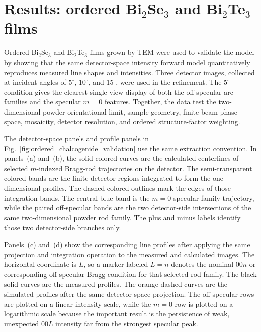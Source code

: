 \section{Results: ordered Bi\texorpdfstring{$_2$}{2}Se\texorpdfstring{$_3$}{3} and Bi\texorpdfstring{$_2$}{2}Te\texorpdfstring{$_3$}{3} films}
\label{sec:results_ordered}

Ordered Bi$_2$Se$_3$ and Bi$_2$Te$_3$ films grown by TEM were used to validate the model by showing that the same detector-space intensity forward model quantitatively reproduces measured line shapes and intensities. Three detector images, collected at incident angles of $5^\circ$, $10^\circ$, and $15^\circ$, were used in the refinement. The $5^\circ$ condition gives the clearest single-view display of both the off-specular arc families and the specular $m=0$ features. Together, the data test the two-dimensional powder orientational limit, sample geometry, finite beam phase space, mosaicity, detector resolution, and ordered structure-factor weighting.

The detector-space panels and profile panels in Fig.~\ref{fig:ordered_chalcogenide_validation} use the same extraction convention. In panels~(a) and~(b), the solid colored curves are the calculated centerlines of selected $m$-indexed Bragg-rod trajectories on the detector. The semi-transparent colored bands are the finite detector regions integrated to form the one-dimensional profiles. The dashed colored outlines mark the edges of those integration bands. The central blue band is the $m=0$ specular-family trajectory, while the paired off-specular bands are the two detector-side intersections of the same two-dimensional powder rod family. The plus and minus labels identify those two detector-side branches only.

Panels~(c) and~(d) show the corresponding line profiles after applying the same projection and integration operation to the measured and calculated images. The horizontal coordinate is $L$, so a marker labeled $L=n$ denotes the nominal $00n$ or corresponding off-specular Bragg condition for that selected rod family. The black solid curves are the measured profiles. The orange dashed curves are the simulated profiles after the same detector-space projection. The off-specular rows are plotted on a linear intensity scale, while the $m=0$ row is plotted on a logarithmic scale because the important result is the persistence of weak, unexpected $00L$ intensity far from the strongest specular peak.

